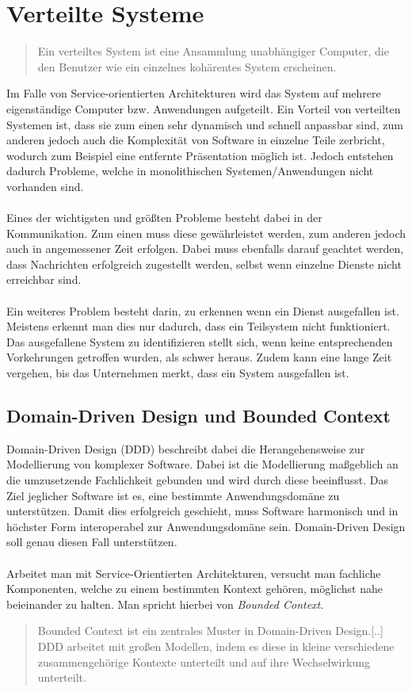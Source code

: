 \section{Verteilte Systeme}
\label{sec:VerteilteAnwendungen}
\begin{quotation}
    \frqq Ein verteiltes System ist eine Ansammlung unabhängiger Computer, die den Benutzer wie ein einzelnes kohärentes System erscheinen.\flqq\cite[S. 19]{tanenbaum:VerteilteSysteme}
\end{quotation}
Im Falle von Service-orientierten Architekturen wird das System auf mehrere eigenständige Computer bzw. Anwendungen aufgeteilt. Ein Vorteil von verteilten Systemen ist, dass sie zum einen sehr dynamisch und schnell anpassbar sind, zum anderen jedoch auch die Komplexität von Software in einzelne Teile zerbricht, wodurch zum Beispiel eine entfernte Präsentation möglich ist.
Jedoch entstehen dadurch Probleme, welche in monolithischen Systemen/Anwendungen nicht vorhanden sind.
\\\\
Eines der wichtigsten und größten Probleme besteht dabei in der Kommunikation. Zum einen muss diese gewährleistet werden, zum anderen jedoch auch in angemessener Zeit erfolgen. Dabei muss ebenfalls darauf geachtet werden, dass Nachrichten erfolgreich zugestellt werden, selbst wenn einzelne Dienste nicht erreichbar sind.
\\\\
Ein weiteres Problem besteht darin, zu erkennen wenn ein Dienst ausgefallen ist. Meistens erkennt man dies nur dadurch, dass ein Teilsystem nicht funktioniert. Das ausgefallene System zu identifizieren stellt sich, wenn keine entsprechenden Vorkehrungen getroffen wurden, als schwer heraus. Zudem kann eine lange Zeit vergehen, bis das Unternehmen merkt, dass ein System ausgefallen ist.

\subsection{Domain-Driven Design und Bounded Context}
\label{sec:boundedContext}
Domain-Driven Design (DDD) beschreibt dabei die Herangehensweise zur Modellierung von komplexer Software. Dabei ist die Modellierung maßgeblich an die umzusetzende Fachlichkeit gebunden und wird durch diese beeinflusst. Das Ziel jeglicher Software ist es, eine bestimmte Anwendungsdomäne zu unterstützen. Damit dies erfolgreich geschieht, muss Software harmonisch und in höchster Form interoperabel zur Anwendungsdomäne sein. Domain-Driven Design soll genau diesen Fall unterstützen.
\\\\
Arbeitet man mit Service-Orientierten Architekturen, versucht man fachliche Komponenten, welche zu einem bestimmten Kontext gehören, möglichst nahe beieinander zu halten. Man spricht hierbei von \textit{Bounded Context}. 
\begin{quotation}
    \frqq Bounded Context ist ein zentrales Muster in Domain-Driven Design.[..] DDD arbeitet mit großen Modellen, indem es diese in kleine verschiedene zusammengehörige Kontexte unterteilt und auf ihre Wechselwirkung unterteilt.\flqq \cite{mfowler:BoundedContext}
\end{quotation}

